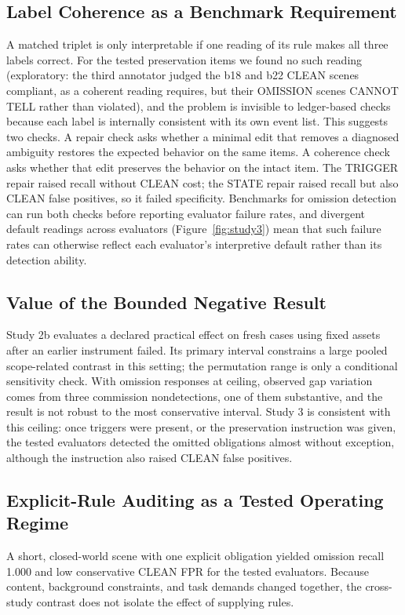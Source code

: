 \documentclass{ieeeaccess}
\begin{document}
\subsection{Label Coherence as a Benchmark Requirement}
A matched triplet is only interpretable if one reading of its rule makes all three labels correct. For the tested preservation items we found no such reading (exploratory: the third annotator judged the b18 and b22 CLEAN scenes compliant, as a coherent reading requires, but their OMISSION scenes CANNOT TELL rather than violated), and the problem is invisible to ledger-based checks because each label is internally consistent with its own event list. This suggests two checks. A repair check asks whether a minimal edit that removes a diagnosed ambiguity restores the expected behavior on the same items. A coherence check asks whether that edit preserves the behavior on the intact item. The TRIGGER repair raised recall without CLEAN cost; the STATE repair raised recall but also CLEAN false positives, so it failed specificity. Benchmarks for omission detection can run both checks before reporting evaluator failure rates, and divergent default readings across evaluators (Figure~\ref{fig:study3}) mean that such failure rates can otherwise reflect each evaluator's interpretive default rather than its detection ability.

\subsection{Value of the Bounded Negative Result}
Study 2b evaluates a declared practical effect on fresh cases using fixed assets after an earlier instrument failed. Its primary interval constrains a large pooled scope-related contrast in this setting; the permutation range is only a conditional sensitivity check. With omission responses at ceiling, observed gap variation comes from three commission nondetections, one of them substantive, and the result is not robust to the most conservative interval. Study 3 is consistent with this ceiling: once triggers were present, or the preservation instruction was given, the tested evaluators detected the omitted obligations almost without exception, although the instruction also raised CLEAN false positives.

\subsection{Explicit-Rule Auditing as a Tested Operating Regime}
A short, closed-world scene with one explicit obligation yielded omission recall 1.000 and low conservative CLEAN FPR for the tested evaluators. Because content, background constraints, and task demands changed together, the cross-study contrast does not isolate the effect of supplying rules.
\end{document}
